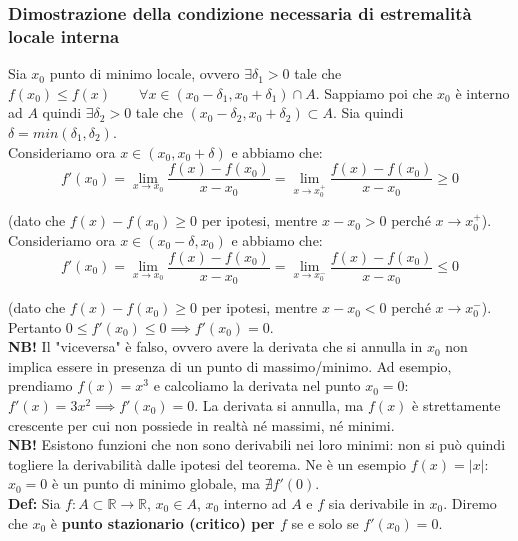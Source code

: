 \documentclass{article}
\begin{document}
\subsubsection{Dimostrazione della condizione necessaria di estremalità locale interna}
Sia $x_0$ punto di minimo locale, ovvero $\exists \delta_1 > 0$ tale che $f(x_0) \leq f(x) \qquad \forall x \in (x_0 - \delta_1, x_0 + \delta_1) \cap A$. Sappiamo poi che $x_0$ è interno ad $A$ quindi $\exists \delta_2 > 0$ tale che $(x_0 - \delta_2, x_0 + \delta_2) \subset A$. Sia quindi $\delta = min(\delta_1, \delta_2)$. \\
Consideriamo ora $x \in (x_0, x_0 + \delta)$ e abbiamo che:
\begin{equation*}
    f'(x_0) = \lim_{x \to x_0} \frac{f(x) - f(x_0)}{x - x_0} = \lim_{x \to x_0^+} \frac{f(x) - f(x_0)}{x - x_0} \geq 0
\end{equation*}

\noindent (dato che $f(x) - f(x_0) \geq 0$ per ipotesi, mentre $x - x_0 > 0$ perché $x \to x_0^+$).\\
Consideriamo ora $x \in (x_0 - \delta, x_0)$ e abbiamo che:
\begin{equation*}
    f'(x_0) = \lim_{x \to x_0} \frac{f(x) - f(x_0)}{x - x_0} = \lim_{x \to x_0^-} \frac{f(x) - f(x_0)}{x - x_0} \leq 0
\end{equation*}

\noindent (dato che $f(x) - f(x_0) \geq 0$ per ipotesi, mentre $x - x_0 < 0$ perché $x \to x_0^-$).\\
Pertanto $0 \leq f'(x_0) \leq 0 \implies f'(x_0) = 0$. \\

\noindent\textbf{NB!} Il "viceversa" è falso, ovvero avere la derivata che si annulla in $x_0$ non implica essere in presenza di un punto di massimo/minimo. Ad esempio, prendiamo $f(x) = x^3$ e calcoliamo la derivata nel punto $x_0 = 0$: $f'(x) = 3x^2 \implies f'(x_0) = 0$. La derivata si annulla, ma $f(x)$ è strettamente crescente per cui non possiede in realtà né massimi, né minimi.\\

\noindent\textbf{NB!} Esistono funzioni che non sono derivabili nei loro minimi: non si può quindi togliere la derivabilità dalle ipotesi del teorema. Ne è un esempio $f(x) = |x|$: $x_0 = 0$ è un punto di minimo globale, ma $\nexists f'(0)$.\\

\noindent\textbf{Def:} Sia $f: A \subset \mathbb{R} \xrightarrow{} \mathbb{R}$, $x_0 \in A$, $x_0$ interno ad $A$ e $f$ sia derivabile in $x_0$. Diremo che $x_0$ è \textbf{punto stazionario (critico) per $f$} se e solo se $f'(x_0) = 0$.
\end{document}
